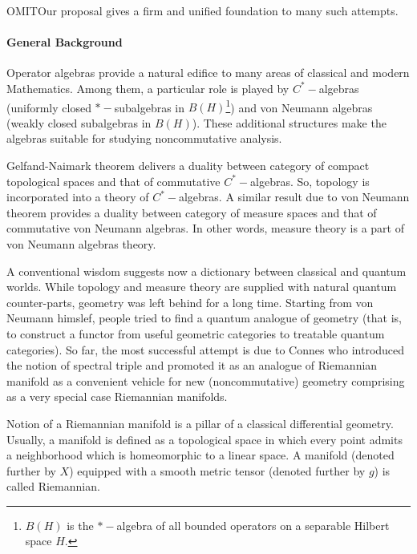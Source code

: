 \documentclass{article}
\begin{document}
{\color{red} OMIT}Our proposal gives a firm and unified foundation to many such attempts.


\paragraph*{General Background}

Operator algebras provide a natural edifice to many areas of classical and modern Mathematics. Among them, a particular role is played by $C^{\ast}-$algebras (uniformly closed $\ast-$subalgebras in $B(H)$\footnote{$B(H)$ is the $\ast-$algebra of all bounded operators on a separable Hilbert space $H.$}) and von Neumann algebras (weakly closed subalgebras in $B(H)$). These additional structures make the algebras suitable for studying noncommutative analysis. 

Gelfand-Naimark theorem delivers a duality between category of compact topological spaces and that of commutative $C^{\ast}-$algebras. So, topology is incorporated into a theory of $C^{\ast}-$algebras. A similar result due to von Neumann theorem provides a duality between category of measure spaces and that of commutative von Neumann algebras. In other words, measure theory is a part of von Neumann algebras theory.

A conventional wisdom suggests now a dictionary between classical and quantum worlds.  While topology and measure theory are supplied with natural quantum counter-parts,  geometry was left behind for a long time. Starting from von Neumann himslef, people tried to find a quantum analogue of geometry (that is, to construct a functor from useful geometric categories to treatable quantum categories). So far, the most successful attempt is due to Connes who introduced the notion of spectral triple and promoted it as an analogue of Riemannian manifold as a convenient vehicle for new (noncommutative) geometry comprising as a very special case Riemannian manifolds.  

Notion of a Riemannian manifold is a pillar of a classical differential geometry. Usually, a manifold is defined as a topological space in which every point admits a neighborhood which is homeomorphic to a linear space. A manifold (denoted further by $X$) equipped with a smooth metric tensor (denoted further by $g$) is called Riemannian.
\end{document}
